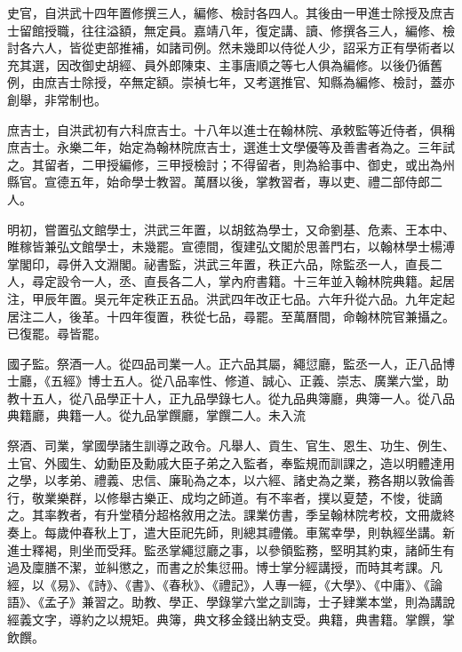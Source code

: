 史官，自洪武十四年置修撰三人，編修、檢討各四人。其後由一甲進士除授及庶吉士留館授職，往往溢額，無定員。嘉靖八年，復定講、讀、修撰各三人，編修、檢討各六人，皆從吏部推補，如諸司例。然未幾即以侍從人少，詔采方正有學術者以充其選，因改御史胡經、員外郎陳束、主事唐順之等七人俱為編修。以後仍循舊例，由庶吉士除授，卒無定額。崇禎七年，又考選推官、知縣為編修、檢討，蓋亦創舉，非常制也。

庶吉士，自洪武初有六科庶吉士。十八年以進士在翰林院、承敕監等近侍者，俱稱庶吉士。永樂二年，始定為翰林院庶吉士，選進士文學優等及善書者為之。三年試之。其留者，二甲授編修，三甲授檢討；不得留者，則為給事中、御史，或出為州縣官。宣德五年，始命學士教習。萬曆以後，掌教習者，專以吏、禮二部侍郎二人。

明初，嘗置弘文館學士，洪武三年置，以胡鉉為學士，又命劉基、危素、王本中、睢稼皆兼弘文館學士，未幾罷。宣德間，復建弘文閣於思善門右，以翰林學士楊溥掌閣印，尋併入文淵閣。祕書監，洪武三年置，秩正六品，除監丞一人，直長二人，尋定設令一人，丞、直長各二人，掌內府書籍。十三年並入翰林院典籍。起居注，甲辰年置。吳元年定秩正五品。洪武四年改正七品。六年升從六品。九年定起居注二人，後革。十四年復置，秩從七品，尋罷。至萬曆間，命翰林院官兼攝之。已復罷。尋皆罷。

國子監。祭酒一人。從四品司業一人。正六品其屬，繩愆廳，監丞一人，正八品博士廳，《五經》博士五人。從八品率性、修道、誠心、正義、崇志、廣業六堂，助教十五人，從八品學正十人，正九品學錄七人。從九品典簿廳，典簿一人。從八品典籍廳，典籍一人。從九品掌饌廳，掌饌二人。未入流

祭酒、司業，掌國學諸生訓導之政令。凡舉人、貢生、官生、恩生、功生、例生、土官、外國生、幼勳臣及勳戚大臣子弟之入監者，奉監規而訓課之，造以明體達用之學，以孝弟、禮義、忠信、廉恥為之本，以六經、諸史為之業，務各期以敦倫善行，敬業樂群，以修舉古樂正、成均之師道。有不率者，撲以夏楚，不悛，徙謫之。其率教者，有升堂積分超格敘用之法。課業仿書，季呈翰林院考校，文冊歲終奏上。每歲仲春秋上丁，遣大臣祀先師，則總其禮儀。車駕幸學，則執經坐講。新進士釋褐，則坐而受拜。監丞掌繩愆廳之事，以參領監務，堅明其約束，諸師生有過及廩膳不潔，並糾懲之，而書之於集愆冊。博士掌分經講授，而時其考課。凡經，以《易》、《詩》、《書》、《春秋》、《禮記》，人專一經，《大學》、《中庸》、《論語》、《孟子》兼習之。助教、學正、學錄掌六堂之訓誨，士子肄業本堂，則為講說經義文字，導約之以規矩。典簿，典文移金錢出納支受。典籍，典書籍。掌饌，掌飲饌。

